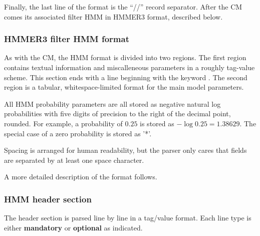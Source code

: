   Finally, the last line of the format is the ``//'' record separator.
  After the CM comes its associated filter HMM in HMMER3 format,
  described below.

\subsubsection{HMMER3 filter HMM format}

As with the CM, the HMM format is divided into two regions. The first
region contains textual information and miscalleneous parameters in a
roughly tag-value scheme.  This section ends with a line beginning
with the keyword . The second region is a tabular,
whitespace-limited format for the main model parameters.

All HMM probability parameters are all stored as negative natural log
probabilities with five digits of precision to the right of the
decimal point, rounded. For example, a probability of $0.25$ is stored
as $-\log 0.25 = 1.38629$. The special case of a zero probability is
stored as '*'.

Spacing is arranged for human readability, but the parser only cares
that fields are separated by at least one space character.

A more detailed description of the format follows.

\subsubsection{HMM header section}

The header section is parsed line by line in a tag/value format. Each
line type is either \textbf{mandatory} or \textbf{optional} as
indicated. 

